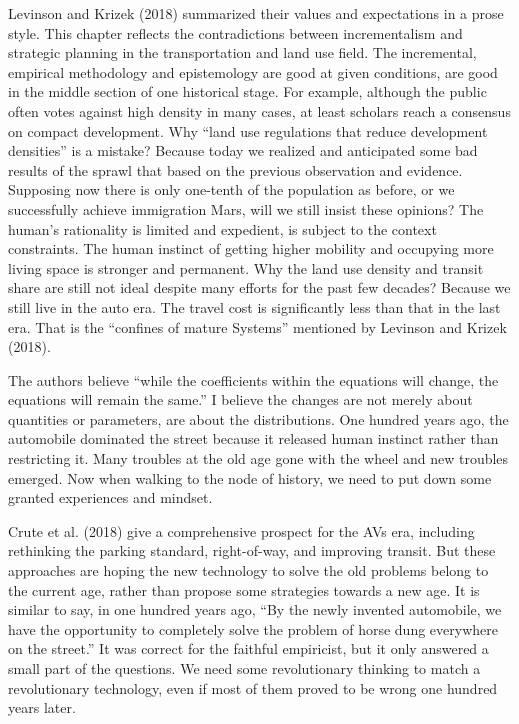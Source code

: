 \documentclass[12pt,]{article}
\begin{document}
Levinson and Krizek (2018) summarized their values and expectations in a
prose style. This chapter reflects the contradictions between
incrementalism and strategic planning in the transportation and land use
field. The incremental, empirical methodology and epistemology are good
at given conditions, are good in the middle section of one historical
stage. For example, although the public often votes against high density
in many cases, at least scholars reach a consensus on compact
development. Why ``land use regulations that reduce development
densities'' is a mistake? Because today we realized and anticipated some
bad results of the sprawl that based on the previous observation and
evidence. Supposing now there is only one-tenth of the population as
before, or we successfully achieve immigration Mars, will we still
insist these opinions? The human's rationality is limited and expedient,
is subject to the context constraints. The human instinct of getting
higher mobility and occupying more living space is stronger and
permanent. Why the land use density and transit share are still not
ideal despite many efforts for the past few decades? Because we still
live in the auto era. The travel cost is significantly less than that in
the last era. That is the ``confines of mature Systems'' mentioned by
Levinson and Krizek (2018).

The authors believe ``while the coefficients within the equations will
change, the equations will remain the same.'' I believe the changes are
not merely about quantities or parameters, are about the distributions.
One hundred years ago, the automobile dominated the street because it
released human instinct rather than restricting it. Many troubles at the
old age gone with the wheel and new troubles emerged. Now when walking
to the node of history, we need to put down some granted experiences and
mindset.

Crute et al. (2018) give a comprehensive prospect for the AVs era,
including rethinking the parking standard, right-of-way, and improving
transit. But these approaches are hoping the new technology to solve the
old problems belong to the current age, rather than propose some
strategies towards a new age. It is similar to say, in one hundred years
ago, ``By the newly invented automobile, we have the opportunity to
completely solve the problem of horse dung everywhere on the street.''
It was correct for the faithful empiricist, but it only answered a small
part of the questions. We need some revolutionary thinking to match a
revolutionary technology, even if most of them proved to be wrong one
hundred years later.
\end{document}
